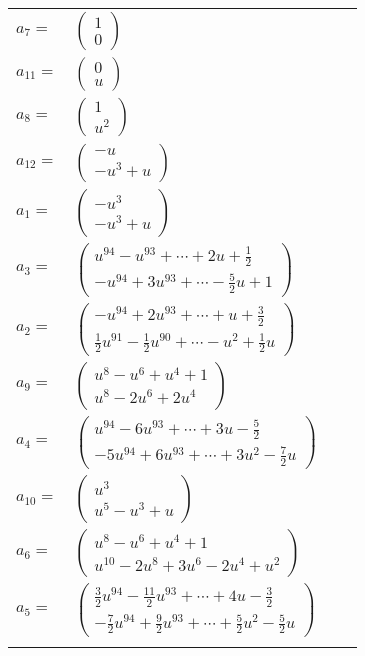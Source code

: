 \documentclass[1p]{elsarticle_modified}
\theoremstyle{definition}
\begin{document}
\begin{tabular}{m{7pt} m{180pt} m{7pt} m{180pt} }
\flushright $a_{7}=$&$\begin{pmatrix}1\\0\end{pmatrix}$ \\
\flushright $a_{11}=$&$\begin{pmatrix}0\\u\end{pmatrix}$ \\
\flushright $a_{8}=$&$\begin{pmatrix}1\\u^2\end{pmatrix}$ \\
\flushright $a_{12}=$&$\begin{pmatrix}- u\\- u^3+u\end{pmatrix}$ \\
\flushright $a_{1}=$&$\begin{pmatrix}- u^3\\- u^3+u\end{pmatrix}$ \\
\flushright $a_{3}=$&$\begin{pmatrix}u^{94}- u^{93}+\cdots+2 u+\frac{1}{2}\\- u^{94}+3 u^{93}+\cdots-\frac{5}{2} u+1\end{pmatrix}$ \\
\flushright $a_{2}=$&$\begin{pmatrix}- u^{94}+2 u^{93}+\cdots+u+\frac{3}{2}\\\frac{1}{2} u^{91}-\frac{1}{2} u^{90}+\cdots- u^2+\frac{1}{2} u\end{pmatrix}$ \\
\flushright $a_{9}=$&$\begin{pmatrix}u^8- u^6+u^4+1\\u^8-2 u^6+2 u^4\end{pmatrix}$ \\
\flushright $a_{4}=$&$\begin{pmatrix}u^{94}-6 u^{93}+\cdots+3 u-\frac{5}{2}\\-5 u^{94}+6 u^{93}+\cdots+3 u^2-\frac{7}{2} u\end{pmatrix}$ \\
\flushright $a_{10}=$&$\begin{pmatrix}u^3\\u^5- u^3+u\end{pmatrix}$ \\
\flushright $a_{6}=$&$\begin{pmatrix}u^8- u^6+u^4+1\\u^{10}-2 u^8+3 u^6-2 u^4+u^2\end{pmatrix}$ \\
\flushright $a_{5}=$&$\begin{pmatrix}\frac{3}{2} u^{94}-\frac{11}{2} u^{93}+\cdots+4 u-\frac{3}{2}\\-\frac{7}{2} u^{94}+\frac{9}{2} u^{93}+\cdots+\frac{5}{2} u^2-\frac{5}{2} u\end{pmatrix}$\\&\end{tabular}
\end{document}
